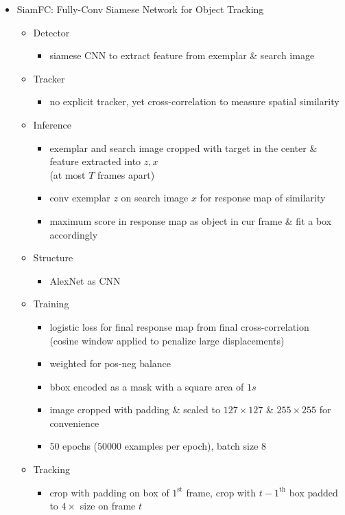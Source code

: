\begin{itemize}
\item SiamFC: Fully-Conv Siamese Network for Object Tracking
	\begin{itemize}
	\item Detector
		\begin{itemize}
		\item siamese CNN to extract feature from exemplar \& search image
		\end{itemize}
	\item Tracker
		\begin{itemize}
		\item no explicit tracker, yet cross-correlation to measure spatial similarity
		\end{itemize}
	\item Inference
		\begin{itemize}
		\item exemplar and search image cropped with target in the center \& feature extracted into $z, x$ \\
		(at most $T$ frames apart)
		\item conv exemplar $z$ on search image $x$ for response map of similarity
		\item maximum score in response map as object in cur frame \& fit a box accordingly
		\end{itemize}
	\item Structure
		\begin{itemize}
		\item AlexNet as CNN
		\end{itemize}
	\item Training
		\begin{itemize}
		\item logistic loss for final response map from final cross-correlation \\
		(cosine window applied to penalize large displacements)
		\item weighted for pos-neg balance
		\item bbox encoded as a mask with a square area of $1s$
		\item image cropped with padding \& scaled to $127\times127$ \& $255\times255$ for convenience
		\item $50$ epochs ($50000$ examples per epoch), batch size $8$
		\end{itemize}
	\item Tracking
		\begin{itemize}
		\item crop with padding on box of $1^\text{st}$ frame, crop with $t-1^\text{th}$ box padded to $4\times$ size on frame $t$

\end{itemize}
\end{itemize}
\end{itemize}
